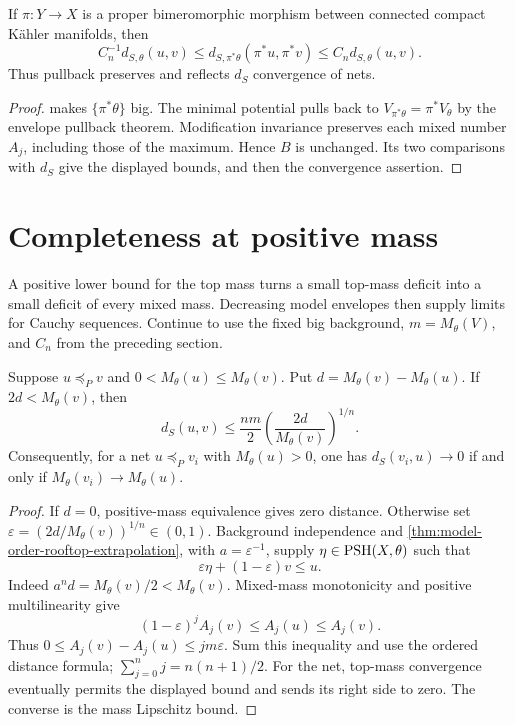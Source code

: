 \begin{corollary}\label{cor:singularity-distance-modification-invariance}
If $\pi:Y\to X$ is a proper bimeromorphic morphism between connected compact K\"ahler manifolds, then
\[
 C_n^{-1}d_{S,\theta}(u,v)
 \leq d_{S,\pi^*\theta}(\pi^*u,\pi^*v)
 \leq C_n d_{S,\theta}(u,v).
\]
Thus pullback preserves and reflects $d_S$ convergence of nets.
\end{corollary}
\begin{proof}
 makes $\{\pi^*\theta\}$ big. The minimal potential pulls back to $V_{\pi^*\theta}=\pi^*V_\theta$ by the envelope pullback theorem. Modification invariance preserves each mixed number $A_j$, including those of the maximum. Hence $B$ is unchanged. Its two comparisons with $d_S$ give the displayed bounds, and then the convergence assertion.
\end{proof}

\section{Completeness at positive mass}
\label{sec:singularity-positive-mass-completeness}
A positive lower bound for the top mass turns a small top-mass deficit into a small deficit of every mixed mass. Decreasing model envelopes then supply limits for Cauchy sequences. Continue to use the fixed big background, $m=M_\theta(V)$, and $C_n$ from the preceding section.

\begin{proposition}\label{prop:ordered-mass-distance-modulus}
Suppose $u\preceq_P v$ and $0<M_\theta(u)\leq M_\theta(v)$. Put $d=M_\theta(v)-M_\theta(u)$. If $2d<M_\theta(v)$, then
\[
 d_S(u,v)\leq\frac{nm}{2}
              \left(\frac{2d}{M_\theta(v)}\right)^{1/n}.
\]
Consequently, for a net $u\preceq_P v_i$ with $M_\theta(u)>0$, one has $d_S(v_i,u)\to0$ if and only if $M_\theta(v_i)\to M_\theta(u)$.
\end{proposition}
\begin{proof}
If $d=0$, positive-mass equivalence gives zero distance. Otherwise set $\varepsilon=(2d/M_\theta(v))^{1/n}\in(0,1)$. Background independence and \cref{thm:model-order-rooftop-extrapolation}, with $a=\varepsilon^{-1}$, supply $\eta\in\mathrm{PSH}(X,\theta)$ such that
\[
 \varepsilon\eta+(1-\varepsilon)v\leq u.
\]
Indeed $a^nd=M_\theta(v)/2<M_\theta(v)$. Mixed-mass monotonicity and positive multilinearity give
\[
 (1-\varepsilon)^jA_j(v)\leq A_j(u)\leq A_j(v).
\]
Thus $0\leq A_j(v)-A_j(u)\leq jm\varepsilon$. Sum this inequality and use the ordered distance formula; $\sum_{j=0}^n j=n(n+1)/2$. For the net, top-mass convergence eventually permits the displayed bound and sends its right side to zero. The converse is the mass Lipschitz bound.
\end{proof}

